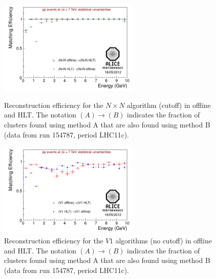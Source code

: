 \begin{figure}[ht]
\begin{minipage}{16pc}
\includegraphics[width=16pc]{figures/emcal_cluster_match_nxn.pdf}
\caption{\label{f5} Reconstruction efficiency for the $N\times N$ algorithm  (cutoff) in offline and HLT. The notation $(A) \rightarrow (B)$ indicates
the fraction of clusters found using method A that are also found using method B (data from run 154787, period LHC11c).}
\end{minipage}\hspace{2pc}
\begin{minipage}{16pc}
\includegraphics[width=16pc]{figures/emcal_cluster_match_v1.pdf}
\caption{\label{f6}Reconstruction efficiency for the $V1$ algorithms (no cutoff) in offline and HLT. The notation $(A) \rightarrow (B)$ indicates
the fraction of clusters found using method A that are also found using method B (data from run 154787, period LHC11c).}
\end{minipage} 
\end{figure}

